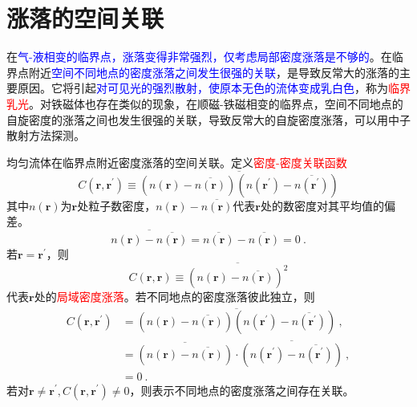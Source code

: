 \documentclass[11pt,a4paper]{article}
\renewcommand{\vec}[1]{\boldsymbol{#1}}
\begin{document}
\section{涨落的空间关联}
\cite{2007热力学与统计物理学} 在\textcolor{blue}{气-液相变的临界点，涨落变得非常强烈，仅考虑局部密度涨落是不够的}。在临界点附近\textcolor{blue}{空间不同地点的密度涨落之间发生很强的关联}，是导致反常大的涨落的主要原因。它将引起\textcolor{blue}{对可见光的强烈散射，使原本无色的流体变成乳白色}，称为\textcolor{red}{临界乳光}。对铁磁体也存在类似的现象，在顺磁-铁磁相变的临界点，空间不同地点的自旋密度的涨落之间也发生很强的关联，导致反常大的自旋密度涨落，可以用中子散射方法探测。

均匀流体在临界点附近密度涨落的空间关联。定义\textcolor{red}{密度-密度关联函数}
\begin{equation}
C(\vec{r}, \vec{r}^\prime) \equiv \overline{(n(\vec{r}) -\overline{n(\vec{r})} )(n(\vec{r}^\prime) -\overline{n(\vec{r}^\prime)} )}
\end{equation}
其中$n(\vec{r})$为$\vec{r}$处粒子数密度，$n(\vec{r}) -\overline{n(\vec{r})}$代表$\vec{r}$处的数密度对其平均值的偏差。
\begin{equation}
\overline{n(\vec{r}) -\overline{n(\vec{r})} } = \overline{n(\vec{r})} -\overline{n(\vec{r})}  = 0 ~.
\end{equation}
若$\vec{r} = \vec{r}^\prime$，则
\begin{equation}
C(\vec{r}, \vec{r}) \equiv \overline{(n(\vec{r}) -\overline{n(\vec{r})} )^2} 
\end{equation}
代表$\vec{r} $处的\textcolor{red}{局域密度涨落}。若不同地点的密度涨落彼此独立，则
\begin{align}
\nonumber C(\vec{r}, \vec{r}^\prime) &= \overline{(n(\vec{r}) -\overline{n(\vec{r})} )(n(\vec{r}^\prime) -\overline{n(\vec{r}^\prime)} )} ~, \\
\nonumber &= \overline{(n(\vec{r}) -\overline{n(\vec{r})} )} \cdot  \overline{(n(\vec{r}^\prime) -\overline{n(\vec{r}^\prime)} )} ~, \\
&= 0 ~.
\end{align}
若对$\vec{r} \neq \vec{r}^\prime, C(\vec{r}, \vec{r}^\prime) \neq 0$，则表示不同地点的密度涨落之间存在关联。
\end{document}
